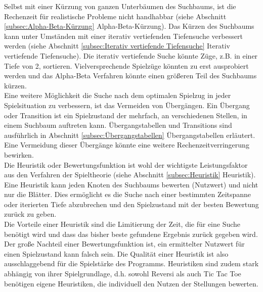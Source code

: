 Selbst mit einer Kürzung von ganzen Unterbäumen des Suchbaums, ist die Rechenzeit für realistische Probleme nicht handhabbar (siehe Abschnitt \ref{subsec:Alpha-Beta-Kürzung} Alpha-Beta-Kürzung). Das Kürzen des Suchbaums kann unter Umständen mit einer iterativ vertiefenden Tiefensuche verbessert werden (siehe Abschnitt \ref{subsec:Iterativ vertiefende Tiefensuche} Iterativ vertiefende Tiefensuche). Die iterativ vertiefende Suche könnte Züge, z.B. in einer Tiefe von 2, sortieren. Vielversprechende Spielzüge könnten zu erst ausprobiert werden und das Alpha-Beta Verfahren könnte einen größeren Teil des Suchbaums kürzen. \\

Eine weitere Möglichkeit die Suche nach dem optimalen Spielzug in jeder Spielsituation zu verbessern, ist das Vermeiden von Übergängen. Ein Übergang oder Transition ist ein Spielzustand der mehrfach, an verschiedenen Stellen, in einem Suchbaum auftreten kann. Übergangstabellen und Transitions sind ausführlich in Abschnitt \ref{subsec:Übergangstabellen} Übergangstabellen erläutert. Eine Vermeidung dieser Übergänge könnte eine weitere Rechenzeitverringerung bewirken. \\

Die Heuristik oder Bewertungsfunktion ist wohl der wichtigste Leistungsfaktor aus den Verfahren der Spieltheorie (siehe Abschnitt \ref{subsec:Heuristik} Heuristik). Eine Heuristik kann jeden Knoten des Suchbaums bewerten (Nutzwert) und nicht nur die Blätter. Dies ermöglicht es die Suche nach einer bestimmten Zeitspanne oder iterierten Tiefe abzubrechen und den Spielzustand mit der besten Bewertung zurück zu geben. \\

Die Vorteile einer Heuristik sind die Limitierung der Zeit, die für eine Suche benötigt wird und dass das bisher beste gefundene Ergebnis zurück gegeben wird. Der große Nachteil einer Bewertungsfunktion ist, ein ermittelter Nutzwert für einen Spielzustand kann falsch sein. Die Qualität einer Heuristik ist also ausschlaggebend für die Spielstärke des Programms. Heuristiken sind zudem stark abhängig von ihrer Spielgrundlage, d.h. sowohl Reversi als auch Tic Tac Toe benötigen eigene Heuristiken, die individuell den Nutzen der Stellungen bewerten. \\

